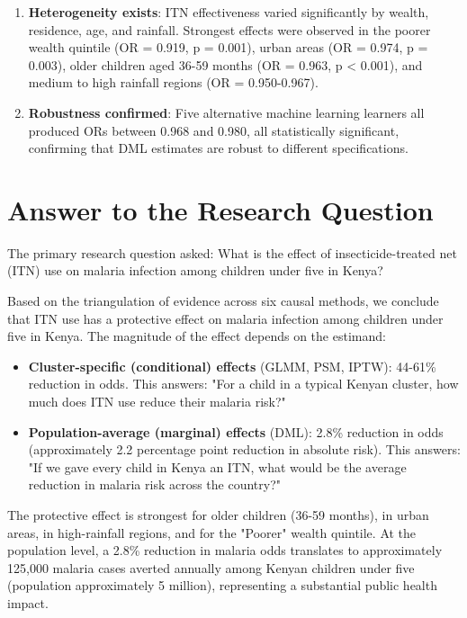 \begin{enumerate}
	\item \textbf{Heterogeneity exists}: ITN effectiveness varied significantly by wealth, residence, age, and rainfall. Strongest effects were observed in the poorer wealth quintile (OR = 0.919, p = 0.001), urban areas (OR = 0.974, p = 0.003), older children aged 36-59 months (OR = 0.963, p < 0.001), and medium to high rainfall regions (OR = 0.950-0.967).
	
	\item \textbf{Robustness confirmed}: Five alternative machine learning learners all produced ORs between 0.968 and 0.980, all statistically significant, confirming that DML estimates are robust to different specifications.
\end{enumerate}

\section{Answer to the Research Question}

The primary research question asked: What is the effect of insecticide-treated net (ITN) use on malaria infection among children under five in Kenya?

Based on the triangulation of evidence across six causal methods, we conclude that ITN use has a protective effect on malaria infection among children under five in Kenya. The magnitude of the effect depends on the estimand:

\begin{itemize}
	\item \textbf{Cluster-specific (conditional) effects} (GLMM, PSM, IPTW): 44-61\% reduction in odds. This answers: "For a child in a typical Kenyan cluster, how much does ITN use reduce their malaria risk?"
	
	\item \textbf{Population-average (marginal) effects} (DML): 2.8\% reduction in odds (approximately 2.2 percentage point reduction in absolute risk). This answers: "If we gave every child in Kenya an ITN, what would be the average reduction in malaria risk across the country?"
\end{itemize}

The protective effect is strongest for older children (36-59 months), in urban areas, in high-rainfall regions, and for the "Poorer" wealth quintile. At the population level, a 2.8\% reduction in malaria odds translates to approximately 125,000 malaria cases averted annually among Kenyan children under five (population approximately 5 million), representing a substantial public health impact.


